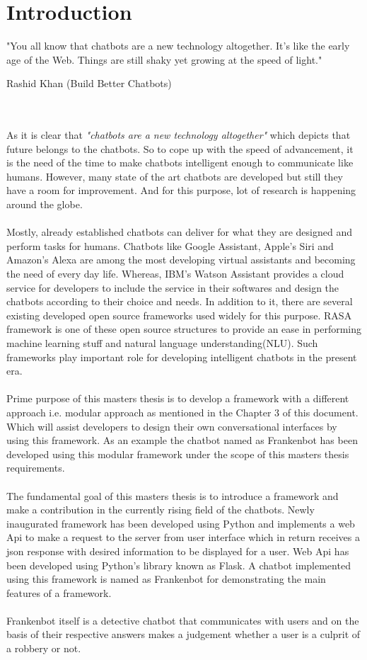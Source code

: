 \chapter{Introduction\label{cha:chapter1}}
\epigraph{"You all know that chatbots are a new technology altogether. It’s like the early age of the Web. Things are still shaky yet growing at the speed of light."}{Rashid Khan (Build Better Chatbots)}
\\~\\
As it is clear that {\textit{"chatbots are a new technology altogether"}} which depicts that future belongs to the chatbots. So to cope up with the speed of advancement, it is the need of the time to make chatbots intelligent enough to communicate like humans. However, many state of the art chatbots are developed but still they have a room for improvement. And for this purpose, lot of research is happening around the globe.
\\~\\
Mostly, already established chatbots can deliver for what they are designed and perform tasks for humans. Chatbots like Google Assistant, Apple's Siri and Amazon's Alexa are among the most developing virtual assistants and becoming the need of every day life. Whereas, IBM's Watson Assistant provides a cloud service for developers to include the service in their softwares and design the chatbots according to their choice and needs. In addition to it, there are several existing developed open source frameworks used widely for this purpose. RASA framework is one of these open source structures to provide an ease in performing machine learning stuff and natural language understanding(NLU). Such frameworks play important role for developing intelligent chatbots in the present era. 
\\~\\
Prime purpose of this masters thesis is to develop a framework with a different approach i.e. modular approach as mentioned in the Chapter 3 of this document. Which will assist developers to design their own conversational interfaces by using this framework. As an example the chatbot named as Frankenbot has been developed using this modular framework under the scope of this masters thesis requirements.
\\~\\
The fundamental goal of this masters thesis is to introduce a framework and make a contribution in the currently rising field of the chatbots. Newly inaugurated framework has been developed using Python and implements a web Api to make a request to the server from user interface which in return receives a json response with desired information to be displayed for a user. Web Api has been developed using Python's library known as Flask. A chatbot implemented using this framework is named as Frankenbot for demonstrating the main features of a framework. 
\\~\\
Frankenbot itself is a detective chatbot that communicates with users and on the basis of their respective answers makes a judgement whether a user is a culprit of a robbery or not.

